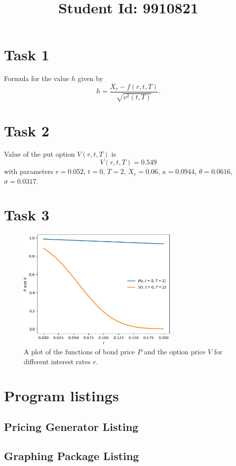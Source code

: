 \documentclass{article}
\begin{document}
\title{Student Id: 9910821}
\date{}

\maketitle

\section*{Task 1}
Formula for the value $h$ given by
\begin{equation}
h = \frac{ X_r-f(r,t,T)}{\sqrt{v^2(t,T)}}.
\end{equation}

\section*{Task 2}
Value of the put option $V(r,t,T)$ is 
\begin{equation}
V(r,t,T) = 0.549
\end{equation}
with parameters $r=0.052$, $t=0$, $T=2$, $X_r=0.06$, $\kappa=0.0944$, $\theta=0.0616$, $\sigma=0.0317$.

\section*{Task 3}
\begin{figure}[h]
\includegraphics[width=0.7\textwidth,center]{plot.png}
\caption{A plot of the functions of bond price $P$ and the option price $V$ for different interest rates $r$.}
\end{figure}


\section*{Program listings}
\lstset{style=mystyle}
\subsection*{Pricing Generator Listing}

\subsection*{Graphing Package Listing}

\end{document}
